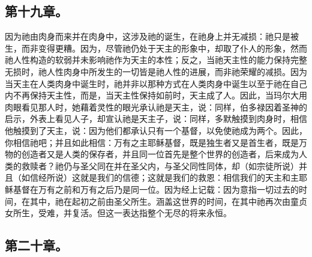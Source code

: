 
\subsection{第十九章。}

\par

因为祂由肉身而来并在肉身中，这涉及祂的诞生，在祂身上并无减损：祂只是被生，而非变得更糟。因为，尽管祂仍处于天主的形象中，却取了仆人的形象，然而祂人性构造的软弱并未影响祂作为天主的本性；反之，当祂天主性的能力保持完整无损时，祂人性肉身中所发生的一切皆是祂人性的进展，而非祂荣耀的减损。因为当天主在人类肉身中诞生时，祂并非以那种方式在人类肉身中诞生以至于祂在自己内不再保持天主性，而是，当天主性保持如前时，天主成了人。因此，当玛尔大用肉眼看见那人时，她藉着灵性的眼光承认祂是天主，说：同样，伯多禄因着圣神的启示，外表上看见人子，却宣认祂是天主子，说：同样，多默触摸到肉身时，相信他触摸到了天主，说：因为他们都承认只有一个基督，以免使祂成为两个。因此，你相信祂吧；并且如此相信：万有之主耶稣基督，既是独生者又是首生者，既是万物的创造者又是人类的保存者，并且同一位首先是整个世界的创造者，后来成为人类的救赎者？祂仍与圣父同在并在圣父内，与圣父同性同体，却（如宗徒所说）并且（如信经所说）这就是我们的信德；这就是我们的救恩：相信我们的天主和主耶稣基督在万有之前和万有之后乃是同一位。因为经上记载：因为意指一切过去的时间，在其中，祂在起初之前由圣父所生。涵盖这世界的时间，在其中祂再次由童贞女所生，受难，并复活。但这一表达指整个无尽的将来永恒。\par


\subsection{第二十章。}

\par

